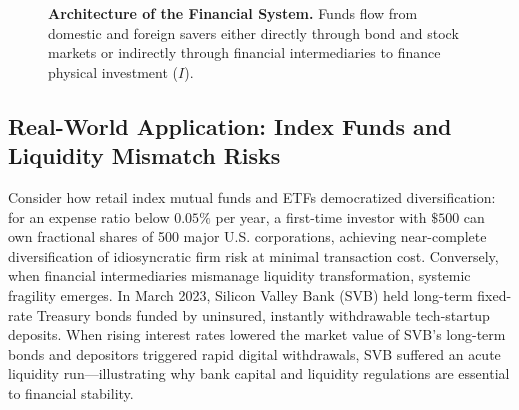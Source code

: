\documentclass[11pt,letterpaper]{article}
\begin{document}
\begin{figure}[h!]
  \caption{\textbf{Architecture of the Financial System.} Funds flow from domestic and foreign savers either directly through bond and stock markets or indirectly through financial intermediaries to finance physical investment ($I$).}
  \label{fig:ch7-financial-system}
\end{figure}

\subsection*{Real-World Application: Index Funds and Liquidity Mismatch Risks}
Consider how retail index mutual funds and ETFs democratized diversification: for an expense ratio below $0.05\%$ per year, a first-time investor with $\$500$ can own fractional shares of 500 major U.S. corporations, achieving near-complete diversification of idiosyncratic firm risk at minimal transaction cost. Conversely, when financial intermediaries mismanage liquidity transformation, systemic fragility emerges. In March 2023, Silicon Valley Bank (SVB) held long-term fixed-rate Treasury bonds funded by uninsured, instantly withdrawable tech-startup deposits. When rising interest rates lowered the market value of SVB's long-term bonds and depositors triggered rapid digital withdrawals, SVB suffered an acute liquidity run—illustrating why bank capital and liquidity regulations are essential to financial stability.
\end{document}
